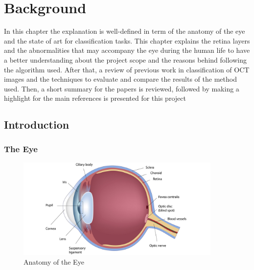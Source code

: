 \chapter{Background} \label{chap:background}

In this chapter the explanation is well-defined in term of the anatomy of the eye and the state of art for classification tasks.
This chapter explains the retina layers and the abnormalities that may accompany the eye during the human life to have a better understanding about the project scope and the reasons behind following the algorithm used.
After that, a review of previous work in classification of OCT images and the techniques to evaluate and compare the results of the method used.
Then, a short summary for the papers is reviewed, followed by making a highlight for the main references is presented for this project   

\section{Introduction}

\subsection{The Eye}

\begin{figure}[htb]
        \centering
        \includegraphics[width = 0.9\textwidth]{figures/Eye_anatomy.jpg} %
  \caption{Anatomy of the Eye \cite{eyeimage}}
  \label{fig:Eyeanatomy}
\end{figure}  


